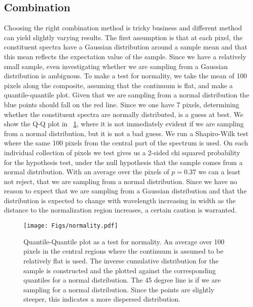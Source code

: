 \documentclass{aa}    %
\newcommand{\figref}[1]{\ref{fig:#1}}
\newcommand{\Fig}[1]{\figurename~\figref{#1}}
\newcommand{\fig}[1]{\Fig{#1}}
\newcommand{\figlabel}[1]{\label{fig:#1}}
\newcommand{\sectlabel}[1]{\label{sect:#1}}
\begin{document}
\subsection{Combination}  \sectlabel{combine}

Choosing the right combination method is tricky business and different method can yield slightly varying results. The first assumption is that at each pixel, the constituent spectra have a Gaussian distribution around a sample mean and that this mean reflects the expectation value of the sample. Since we have a relatively small sample, even investigating whether we are sampling from a Gaussian distribution is ambiguous. To make a test for normality, we take the mean of 100 pixels along the composite, assuming that the continuum is flat, and make a quantile-quantile plot. Given that we are sampling from a normal distribution the blue points should fall on the red line. Since we one have 7 pixels, determining whether the constituent spectra are normally distributed, is a guess at best. We show the Q-Q plot in \fig{normality}, where it is not immediately evident if we are sampling from a normal distribution, but it is not a bad guess. We run a Shapiro-Wilk test where the same 100 pixels from the central part of the spectrum is used. On each individual collection of pixels we test gives us a 2-sided chi squared probability for the hypothesis test, under the null hypothesis that the sample comes from a normal distribution. With an average over the pixels of $p = 0.37$ we can a least not reject, that we are sampling from a normal distribution. Since we have no reason to expect that we are sampling from a Gaussian distribution and that the distribution is expected to change with wavelength increasing in width as the distance to the normalization region increases, a certain caution is warranted. 

\begin{figure}[hbtp]
  \centering
  \texttt{[image: Figs/normality.pdf]}
  \caption[]{Quantile-Quantile plot as a test for normality. An average over 100 pixels in the central regions where the continuum is assumed to be relatively flat is used. The inverse cumulative distribution for the sample is constructed and the plotted against the corresponding quantiles for a normal distribution. The 45 degree line is if we are sampling for a normal distribution. Since the points are slightly steeper, this indicates a more dispersed distribution.}
 \figlabel{normality}
\end{figure}
\end{document}
